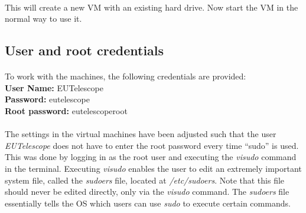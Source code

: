 \documentclass[11pt]{article}
\begin{document}
\paragraph{}
This will create a new VM with an existing hard drive. Now start the VM in the normal way to use it.
\subsection{User and root credentials}
\paragraph{}
To work with the machines, the following credentials are provided:\\
\textbf{User Name:} EUTelescope\\
\textbf{Password:} eutelescope\\
\textbf{Root password:} eutelescoperoot\\
\paragraph{}
The settings in the virtual machines have been adjusted such that the user \textit{EUTelescope} does not have to enter the root password every time ``sudo'' is used. This was done by logging in as the root user and executing the \textit{visudo} command in the terminal. Executing \textit{visudo} enables the user to edit an extremely important system file, called the \textit{sudoers} file, located at \textit{/etc/sudoers}. Note that this file should never be edited directly, only via the \textit{visudo} command. The \textit{sudoers} file essentially tells the OS which users can use \textit{sudo} to execute certain commands.
\end{document}
